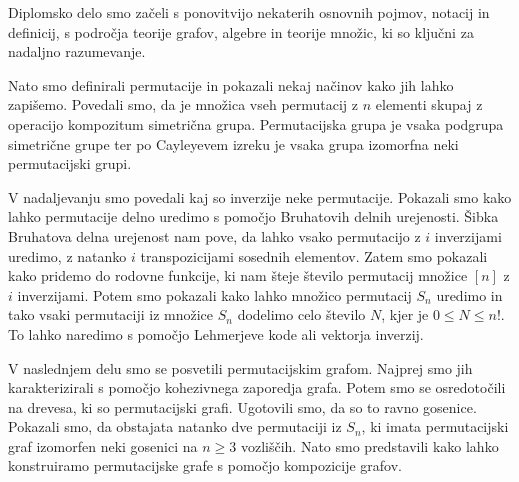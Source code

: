 \documentclass[a4paper, 12pt]{book}
\begin{document}
Diplomsko delo smo začeli s ponovitvijo nekaterih osnovnih pojmov, notacij in definicij, s področja teorije grafov, algebre in teorije množic, ki so ključni za nadaljno razumevanje.

Nato smo definirali permutacije in pokazali nekaj načinov kako jih lahko zapišemo. Povedali smo, da je množica vseh permutacij z $n$ elementi skupaj z operacijo kompozitum simetrična grupa. Permutacijska grupa je vsaka podgrupa simetrične grupe ter po Cayleyevem izreku je vsaka grupa izomorfna neki permutacijski grupi.

V nadaljevanju smo povedali kaj so inverzije neke permutacije. Pokazali smo kako lahko permutacije delno uredimo s pomočjo Bruhatovih delnih urejenosti. Šibka Bruhatova delna urejenost nam pove, da lahko vsako permutacijo z $i$ inverzijami uredimo, z natanko $i$ transpozicijami sosednih elementov. Zatem smo pokazali kako pridemo do rodovne funkcije, ki nam šteje število permutacij množice $[n]$ z $i$ inverzijami. Potem smo pokazali kako lahko množico permutacij $S_n$ uredimo in tako vsaki permutaciji iz množice $S_n$ dodelimo celo število $N$, kjer je $0 \leq N \leq n!$. To lahko naredimo s pomočjo Lehmerjeve kode ali vektorja inverzij.

V naslednjem delu smo se posvetili permutacijskim grafom. Najprej smo jih karakterizirali s pomočjo kohezivnega zaporedja grafa. Potem smo se osredotočili na drevesa, ki so permutacijski grafi. Ugotovili smo, da so to ravno gosenice. Pokazali smo, da obstajata natanko dve permutaciji iz $S_n$, ki imata permutacijski graf izomorfen neki gosenici na $n \geq 3$ vozliščih. Nato smo predstavili kako lahko konstruiramo permutacijske grafe s pomočjo kompozicije grafov.
\end{document}
